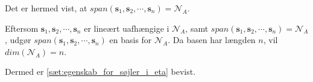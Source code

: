 \begin{bev}
\begin{itemize}
Det er hermed vist, at $span(\textbf{s}_1, \textbf{s}_2,\cdots, \textbf{s}_n) = \mathcal{N}_A$.

Eftersom $\textbf{s}_1, \textbf{s}_2, \cdots, \textbf{s}_n$ er lineært uafhængige i $\mathcal{N}_A$, samt $span(\textbf{s}_1, \textbf{s}_2,\cdots, \textbf{s}_n) = \mathcal{N}_A$, udgør $span(\textbf{s}_1, \textbf{s}_2,\cdots, \textbf{s}_n)$ en basis for $\mathcal{N}_A$. Da basen har længden $n$, vil $dim (\mathcal{N}_A) = n$. 
\end{itemize}
Dermed er \autoref{sæt:egenskab_for_søjler_i_eta} bevist.
\end{bev}
